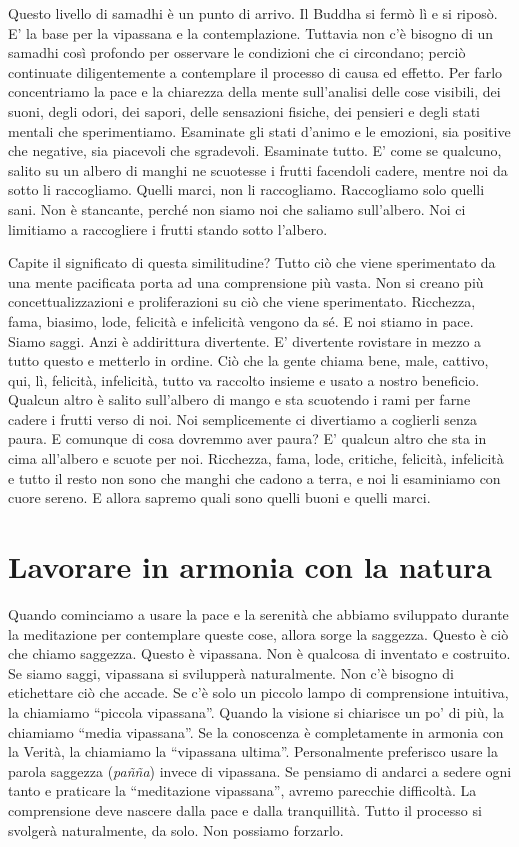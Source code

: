 Questo livello di samadhi è un punto di arrivo. Il Buddha si fermò lì e
si riposò. E' la base per la vipassana e la contemplazione. Tuttavia non
c'è bisogno di un samadhi così profondo per osservare le condizioni che
ci circondano; perciò continuate diligentemente a contemplare il
processo di causa ed effetto. Per farlo concentriamo la pace e la
chiarezza della mente sull'analisi delle cose visibili, dei suoni, degli
odori, dei sapori, delle sensazioni fisiche, dei pensieri e degli stati
mentali che sperimentiamo. Esaminate gli stati d'animo e le emozioni,
sia positive che negative, sia piacevoli che sgradevoli. Esaminate
tutto. E' come se qualcuno, salito su un albero di manghi ne scuotesse i
frutti facendoli cadere, mentre noi da sotto li raccogliamo. Quelli
marci, non li raccogliamo. Raccogliamo solo quelli sani. Non è
stancante, perché non siamo noi che saliamo sull'albero. Noi ci
limitiamo a raccogliere i frutti stando sotto l'albero.

Capite il significato di questa similitudine? Tutto ciò che viene
sperimentato da una mente pacificata porta ad una comprensione più
vasta. Non si creano più concettualizzazioni e proliferazioni su ciò che
viene sperimentato. Ricchezza, fama, biasimo, lode, felicità e
infelicità vengono da sé. E noi stiamo in pace. Siamo saggi. Anzi è
addirittura divertente. E' divertente rovistare in mezzo a tutto questo
e metterlo in ordine. Ciò che la gente chiama bene, male, cattivo, qui,
lì, felicità, infelicità, tutto va raccolto insieme e usato a nostro
beneficio. Qualcun altro è salito sull'albero di mango e sta scuotendo i
rami per farne cadere i frutti verso di noi. Noi semplicemente ci
divertiamo a coglierli senza paura. E comunque di cosa dovremmo aver
paura? E' qualcun altro che sta in cima all'albero e scuote per noi.
Ricchezza, fama, lode, critiche, felicità, infelicità e tutto il resto
non sono che manghi che cadono a terra, e noi li esaminiamo con cuore
sereno. E allora sapremo quali sono quelli buoni e quelli marci.

\section{Lavorare in armonia con la natura}

Quando cominciamo a usare la pace e la serenità che abbiamo sviluppato
durante la meditazione per contemplare queste cose, allora sorge la
saggezza. Questo è ciò che chiamo saggezza. Questo è vipassana. Non è
qualcosa di inventato e costruito. Se siamo saggi, vipassana si
svilupperà naturalmente. Non c'è bisogno di etichettare ciò che accade.
Se c'è solo un piccolo lampo di comprensione intuitiva, la chiamiamo
``piccola vipassana''. Quando la visione si chiarisce un po' di più, la
chiamiamo ``media vipassana''. Se la conoscenza è completamente in
armonia con la Verità, la chiamiamo la ``vipassana ultima''.
Personalmente preferisco usare la parola saggezza (\emph{pañña}) invece
di vipassana. Se pensiamo di andarci a sedere ogni tanto e praticare la
``meditazione vipassana'', avremo parecchie difficoltà. La comprensione
deve nascere dalla pace e dalla tranquillità. Tutto il processo si
svolgerà naturalmente, da solo. Non possiamo forzarlo.

